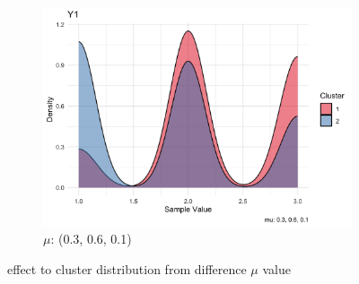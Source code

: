 \documentclass{article}
\begin{document}
\begin{figure}[h]
\begin{subfigure}{0.3\textwidth}
      \centering
      \includegraphics[width=\textwidth]{images/mu_03_06_01.png}
      \caption{$\mu$: (0.3, 0.6, 0.1)}
  \end{subfigure}
  \caption{effect to cluster distribution from difference $\mu$ value}
  \label{fig:mu}
\end{figure}

\end{document}

